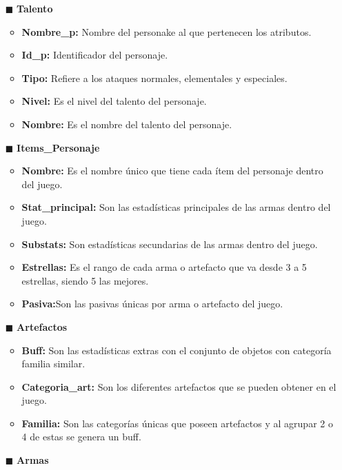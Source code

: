 \documentclass{report}
\begin{document}
\begin{itemize}
\begin{itemize}
        \end{itemize}
    \item[$\blacksquare$]\textbf{Talento}
        \begin{itemize}
            \item \textbf{Nombre\_p:} Nombre del personake al que pertenecen los atributos.
            \item \textbf{Id\_p:} Identificador del personaje.
            \item \textbf{Tipo:} Refiere a los ataques normales, elementales y especiales.
            \item \textbf{Nivel:} Es el nivel del talento del personaje.
            \item \textbf{Nombre:} Es el nombre del talento del personaje.
        \end{itemize}
    \item[$\blacksquare$]\textbf{Items\_Personaje}
        \begin{itemize}
            \item \textbf{Nombre:} Es el nombre único que tiene cada ítem del personaje dentro del juego.
            \item \textbf{Stat\_principal:} Son las estadísticas principales de las armas dentro del juego.
            \item \textbf{Substats:} Son estadísticas secundarias de las armas dentro del juego.
            \item \textbf{Estrellas:} Es el rango de cada arma o artefacto que va desde 3 a 5 estrellas, siendo 5 las mejores.
            \item \textbf{Pasiva:}Son las pasivas únicas por arma o artefacto del juego.
        \end{itemize}
    \item[$\blacksquare$]\textbf{Artefactos}
        \begin{itemize}
            \item \textbf{Buff:} Son las estadísticas extras con el conjunto de objetos con categoría familia similar.
            \item \textbf{Categoria\_art:} Son los diferentes artefactos que se pueden obtener en el juego.
            \item \textbf{Familia:} Son las categorías únicas que poseen artefactos y al agrupar 2 o 4 de estas se genera un buff.
        \end{itemize}
    \item[$\blacksquare$]\textbf{Armas}
        \begin{itemize}

\end{itemize}
\end{itemize}
\end{document}
